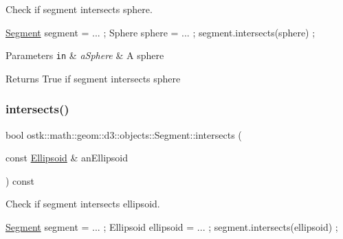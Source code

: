 Check if segment intersects sphere. 


\begin{DoxyCode}
\hyperlink{classostk_1_1math_1_1geom_1_1d3_1_1objects_1_1_segment_aa2cb60ce06335a5f76120c658219494c}{Segment} segment = ... ;
Sphere sphere = ... ;
segment.intersects(sphere) ;
\end{DoxyCode}



\begin{DoxyParams}[1]{Parameters}
\mbox{\tt in}  & {\em a\+Sphere} & A sphere \\
\hline
\end{DoxyParams}
\begin{DoxyReturn}{Returns}
True if segment intersects sphere 
\end{DoxyReturn}
\mbox{\label{classostk_1_1math_1_1geom_1_1d3_1_1objects_1_1_segment_a281320eb45dcfce43caab69fb4051242}} 
\subsubsection{\texorpdfstring{intersects()}{intersects()}\hspace{0.1cm}{\footnotesize\ttfamily [3/3]}}
{\footnotesize\ttfamily bool ostk\+::math\+::geom\+::d3\+::objects\+::\+Segment\+::intersects (\begin{DoxyParamCaption}\item[{const \hyperlink{classostk_1_1math_1_1geom_1_1d3_1_1objects_1_1_ellipsoid}{Ellipsoid} \&}]{an\+Ellipsoid }\end{DoxyParamCaption}) const}



Check if segment intersects ellipsoid. 


\begin{DoxyCode}
\hyperlink{classostk_1_1math_1_1geom_1_1d3_1_1objects_1_1_segment_aa2cb60ce06335a5f76120c658219494c}{Segment} segment = ... ;
Ellipsoid ellipsoid = ... ;
segment.intersects(ellipsoid) ;
\end{DoxyCode}



